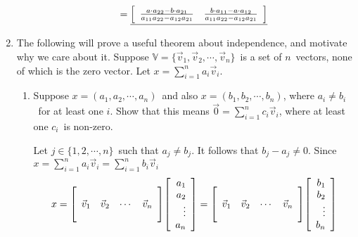 \documentclass{letter}
\newcommand{\Vn}[1]{\vec{#1}}
\newcommand{\?}{\stackrel{?}{=}}
\newcommand\Que[1]{%
   \leavevmode\noindent
   #1
}
\newcommand\Ans[2][]{%
   \leavevmode\noindent
   {
       \begin{mdframed}[backgroundcolor=blue!10]
       #2
       \end{mdframed}
   }
}
\newenvironment{Mat}[1]{%
  \left[\begin{array}{*{#1}{r}}
}{%
  \end{array}\right]
}
\begin{document}
\begin{enumerate}
\begin{enumerate}[label=(\alph*)]
{\begin{align*}
       =  \underline{\begin{Mat}{2} \frac{a\cdot a_{22} - b\cdot a_{21}}{a_{11}a_{22}-a_{12}a_{21}} & \frac{b\cdot a_{11}-a\cdot a_{12}}{a_{11}a_{22}-a_{12}a_{21}} \end{Mat}}
      \end{align*}
    }
    \end{enumerate}
    \newpage
    \item
        The following will prove a useful theorem about independence, and motivate why we care about it.  Suppose
        $\mathbb{V} = \{\Vn{v}_1, \Vn{v}_2, \cdots,\Vn{v}_n\}$\ is a set of $n$\ vectors, none of which is the zero vector.  Let $x=\sum^n_{i=1} a_i\Vn{v}_i$.  
    \begin{enumerate}[label=(\alph*)]  
      \item \Que{
      Suppose $x=(a_1,a_2,\cdots,a_n)$\ and also $x=(b_1,b_2,\cdots,b_n)$, 
      where $a_i\not = b_i$\ for at least one $i$.  Show that this means $\Vn{0}=\sum^n_{i=1}c_i\Vn{v}_i$, 
      where at least one $c_i$\ is non-zero.
      }
      \Ans{
          Let $j\in \{1,2,\cdots,n\}$\ such that $a_j\not = b_j$.  It follows that $b_j-a_j\not = 0$.  Since $x=\sum^n_{i=1}a_i\Vn{v}_i = \sum^n_{i=1}b_i\Vn{v}_i$
          \begin{align*}
              x&=\begin{Mat}{4}          &          &        &         \\
                             \Vn{v}_1 & \Vn{v}_2 & \cdots & \Vn{v}_n \\ 
                                      &          &        &   \end{Mat}
              \begin{Mat}{1} a_1 \\ a_2 \\ \vdots \\ a_n \end{Mat} 
              = 
              \begin{Mat}{4}          &          &        &         \\
                             \Vn{v}_1 & \Vn{v}_2 & \cdots & \Vn{v}_n \\ 
                                      &          &        &   \end{Mat}
              \begin{Mat}{1} b_1 \\ b_2 \\ \vdots \\ b_n \end{Mat} \\

\end{align*}}
\end{enumerate}
\end{enumerate}
\end{document}
